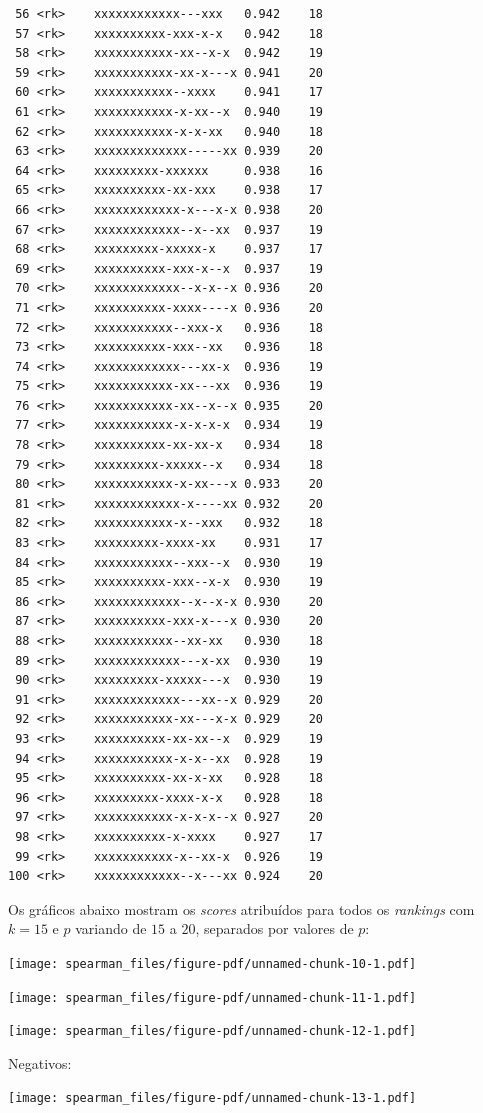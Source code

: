\documentclass[
  letterpaper,
  DIV=11,
  numbers=noendperiod]{scrreprt}
\begin{document}
\begin{verbatim}
 56 <rk>    xxxxxxxxxxxx---xxx   0.942    18
 57 <rk>    xxxxxxxxxx-xxx-x-x   0.942    18
 58 <rk>    xxxxxxxxxxx-xx--x-x  0.942    19
 59 <rk>    xxxxxxxxxxx-xx-x---x 0.941    20
 60 <rk>    xxxxxxxxxxx--xxxx    0.941    17
 61 <rk>    xxxxxxxxxxx-x-xx--x  0.940    19
 62 <rk>    xxxxxxxxxxx-x-x-xx   0.940    18
 63 <rk>    xxxxxxxxxxxxx-----xx 0.939    20
 64 <rk>    xxxxxxxxx-xxxxxx     0.938    16
 65 <rk>    xxxxxxxxxx-xx-xxx    0.938    17
 66 <rk>    xxxxxxxxxxxx-x---x-x 0.938    20
 67 <rk>    xxxxxxxxxxxx--x--xx  0.937    19
 68 <rk>    xxxxxxxxx-xxxxx-x    0.937    17
 69 <rk>    xxxxxxxxxx-xxx-x--x  0.937    19
 70 <rk>    xxxxxxxxxxxx--x-x--x 0.936    20
 71 <rk>    xxxxxxxxxx-xxxx----x 0.936    20
 72 <rk>    xxxxxxxxxxx--xxx-x   0.936    18
 73 <rk>    xxxxxxxxxx-xxx--xx   0.936    18
 74 <rk>    xxxxxxxxxxxx---xx-x  0.936    19
 75 <rk>    xxxxxxxxxxx-xx---xx  0.936    19
 76 <rk>    xxxxxxxxxxx-xx--x--x 0.935    20
 77 <rk>    xxxxxxxxxxx-x-x-x-x  0.934    19
 78 <rk>    xxxxxxxxxx-xx-xx-x   0.934    18
 79 <rk>    xxxxxxxxx-xxxxx--x   0.934    18
 80 <rk>    xxxxxxxxxxx-x-xx---x 0.933    20
 81 <rk>    xxxxxxxxxxxx-x----xx 0.932    20
 82 <rk>    xxxxxxxxxxx-x--xxx   0.932    18
 83 <rk>    xxxxxxxxx-xxxx-xx    0.931    17
 84 <rk>    xxxxxxxxxxx--xxx--x  0.930    19
 85 <rk>    xxxxxxxxxx-xxx--x-x  0.930    19
 86 <rk>    xxxxxxxxxxxx--x--x-x 0.930    20
 87 <rk>    xxxxxxxxxx-xxx-x---x 0.930    20
 88 <rk>    xxxxxxxxxxx--xx-xx   0.930    18
 89 <rk>    xxxxxxxxxxxx---x-xx  0.930    19
 90 <rk>    xxxxxxxxx-xxxxx---x  0.930    19
 91 <rk>    xxxxxxxxxxxx---xx--x 0.929    20
 92 <rk>    xxxxxxxxxxx-xx---x-x 0.929    20
 93 <rk>    xxxxxxxxxx-xx-xx--x  0.929    19
 94 <rk>    xxxxxxxxxxx-x-x--xx  0.928    19
 95 <rk>    xxxxxxxxxx-xx-x-xx   0.928    18
 96 <rk>    xxxxxxxxx-xxxx-x-x   0.928    18
 97 <rk>    xxxxxxxxxxx-x-x-x--x 0.927    20
 98 <rk>    xxxxxxxxxx-x-xxxx    0.927    17
 99 <rk>    xxxxxxxxxxx-x--xx-x  0.926    19
100 <rk>    xxxxxxxxxxxx--x---xx 0.924    20
\end{verbatim}

Os gráficos abaixo mostram os \emph{scores} atribuídos para todos os
\emph{rankings} com $k = 15$ e $p$ variando de $15$ a $20$, separados
por valores de $p$:

\begin{center}
\texttt{[image: spearman\_files/figure-pdf/unnamed-chunk-10-1.pdf]}
\end{center}

\begin{center}
\texttt{[image: spearman\_files/figure-pdf/unnamed-chunk-11-1.pdf]}
\end{center}

\begin{center}
\texttt{[image: spearman\_files/figure-pdf/unnamed-chunk-12-1.pdf]}
\end{center}

Negativos:

\begin{center}
\texttt{[image: spearman\_files/figure-pdf/unnamed-chunk-13-1.pdf]}
\end{center}
\end{document}
